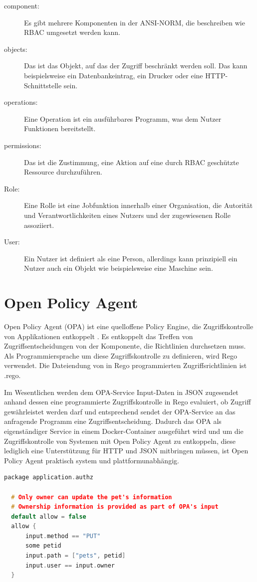 \begin{description}
  \item[component:] Es gibt mehrere Komponenten in der ANSI-NORM, die beschreiben wie \ac{RBAC}
  umgesetzt werden kann.
  \item[objects:] Das ist das Objekt, auf das der Zugriff beschränkt werden soll. Das kann
  beispielsweise ein Datenbankeintrag, ein Drucker oder eine HTTP-Schnittstelle sein.
  \item[operations:] Eine Operation ist ein ausführbares Programm, was dem Nutzer Funktionen
  bereitstellt.
  \item[permissions:] Das ist die Zustimmung, eine Aktion auf eine durch \ac{RBAC} geschützte 
  Ressource durchzuführen.
  \item[Role:] Eine Rolle ist eine Jobfunktion innerhalb einer Organisation, die Autorität und 
  Verantwortlichkeiten eines Nutzers und der zugewiesenen Rolle assoziiert.
  \item[User:] Ein Nutzer ist definiert als eine Person, allerdings kann prinzipiell ein Nutzer auch ein 
  Objekt wie beispielsweise eine Maschine sein.
\end{description}

\section{Open Policy Agent}
\label{sec:OpenPolicyAgent}
Open Policy Agent (OPA) ist eine quelloffene Policy Engine, die Zugriffskontrolle von 
Applikationen entkoppelt \citep{opaperformance:2021:07}. Es entkoppelt das Treffen von Zugriffsentscheidungen von der Komponente, die Richtlinien durchsetzen muss.
Als Programmiersprache um diese Zugriffskontrolle zu definieren, wird Rego verwendet. 
Die Dateiendung von in Rego programmierten Zugriffsrichtlinien ist .rego.\smallskip

Im Wesentlichen werden dem OPA-Service Input-Daten in JSON zugesendet anhand dessen eine 
programmierte Zugriffskontrolle in Rego evaluiert, ob Zugriff gewährleistet werden darf und entsprechend sendet der OPA-Service an das anfragende Programm eine Zugriffsentscheidung. Dadurch das OPA als eigenständiger Service in einem Docker-Container ausgeführt wird und um die Zugriffskontrolle von Systemen mit Open Policy Agent zu entkoppeln, diese lediglich eine Unterstützung für HTTP und JSON mitbringen 
müssen, ist Open Policy Agent praktisch system und plattformunabhängig.

\begin{lstlisting}[language=C++,frame=tb,caption={Zugriffsrichtlinie in Rego},label=lst:ZugriffsrichtlinieinRego]
  package application.authz

  # Only owner can update the pet's information
  # Ownership information is provided as part of OPA's input
  default allow = false
  allow {
      input.method == "PUT"
      some petid
      input.path = ["pets", petid]
      input.user == input.owner
  }
\end{lstlisting}
\smallskip

